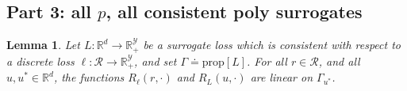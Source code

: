 \documentclass[12pt]{article}
\newcommand{\Comments}{1}
\newcommand{\mynote}[2]{\ifnum\Comments=1\textcolor{#1}{#2}\fi}
\newcommand{\raf}[1]{\mynote{green}{[RF: #1]}}
\newcommand{\reals}{\mathbb{R}}
\newcommand{\defeq}{\doteq}%
\newcommand{\prop}[1]{\mathrm{prop}[#1]}
\newcommand{\R}{\mathcal{R}}
\newcommand{\Y}{\mathcal{Y}}
\newcommand{\risk}[1]{\underline{#1}}
\newcommand{\inprod}[2]{\langle #1, #2 \rangle}%
\newcommand{\regret}[3]{R_{#1}(#2,#3)}
\newtheorem{lemma}{Lemma}
\begin{document}
\subsection{Part 3: all $p$, all consistent poly surrogates}

\begin{lemma}\label{lem:regret-linear}
  Let $L:\reals^d \to \reals^\Y_+$ be a surrogate loss which is consistent with respect to a discrete loss $\ell:\R\to\reals^\Y_+$, and set $\Gamma \defeq \prop{L}$.
  For all $r\in\R$, and all $u,u^*\in\reals^d$, the functions $\regret{\ell}{r}{\cdot}$ and $\regret{L}{u}{\cdot}$ are linear on $\Gamma_{u^*}$.
\end{lemma}
\end{document}

